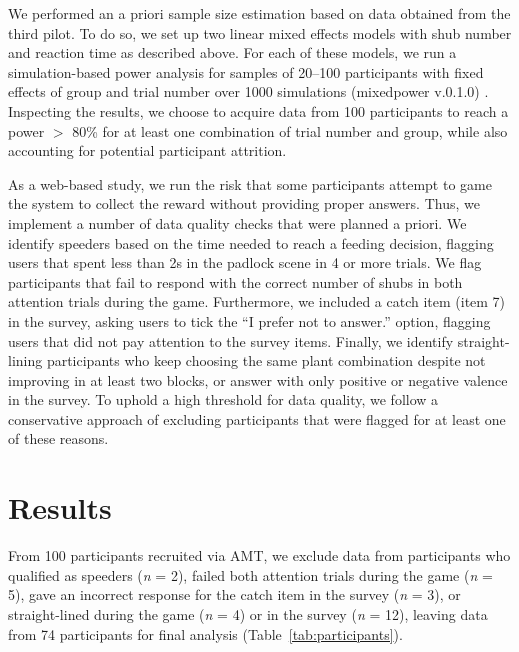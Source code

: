 {We performed an a priori sample size estimation based on data obtained from the third pilot. 
To do so, we set up two linear mixed effects models with shub number and reaction time as described above. 
For each of these models, we run a simulation-based power analysis for samples of 20--100 participants with fixed effects of group and trial number over 1000 simulations (mixedpower v.0.1.0) \citep{kumle_estimating_2021}. 
Inspecting the results, we choose to acquire data from 100 participants to reach a power $>$ 80\% for at least one combination of trial number and group, while also accounting for potential participant attrition.

As a web-based study, we run the risk that some participants attempt to game the system to collect the reward without providing proper answers. 
Thus, we implement a number of data quality checks that were planned a priori.
We identify speeders based on the time needed to reach a feeding decision, flagging users that spent less than 2s in the padlock scene in 4 or more trials.
We flag participants that fail to respond with the correct number of shubs in both attention trials during the game.
Furthermore, we included a catch item (item 7) in the survey, asking users to tick the ``I prefer not to answer.'' option, flagging users that did not pay attention to the survey items.
Finally, we identify straight-lining participants who keep choosing the same plant combination despite not improving in at least two blocks, or answer with only positive or negative valence in the survey.
To uphold a high threshold for data quality, we follow a conservative approach of excluding participants that were flagged for at least one of these reasons.

\section{Results}\label{sec:results}

From 100 participants recruited via \gls{AMT}, we exclude data from participants who qualified as speeders (\textit{n} = 2), failed both attention trials during the game (\textit{n} = 5), gave an incorrect response for the catch item in the survey (\textit{n} = 3), or straight-lined during the game (\textit{n} = 4) or in the survey (\textit{n} = 12), leaving data from 74 participants for final analysis (Table~\ref{tab:participants}).

}
